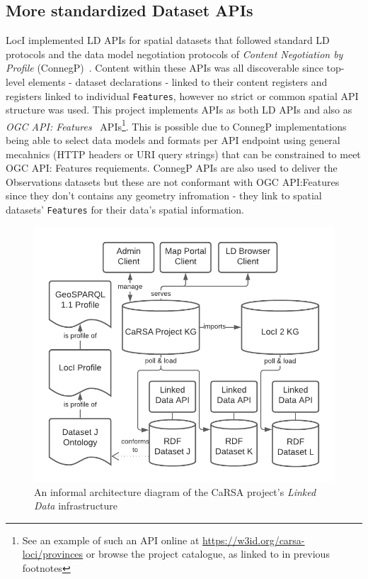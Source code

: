\documentclass[runningheads]{llncs}
\begin{document}
\subsection{More standardized Dataset APIs}
LocI implemented LD APIs for spatial datasets that followed standard LD protocols and the data model negotiation protocols of \textit{Content Negotiation by Profile} (ConnegP)~\cite{atkinson_profiles_2020}.
Content within these APIs was all discoverable since top-level elements - dataset declarations - linked to their content registers and registers linked to individual \texttt{Features}, 
however no strict or common spatial API structure was used. This project implements APIs as both LD APIs and also as \textit{OGC API: Features}~\cite{clemens_portele_ogc_2019} APIs\footnote{See an example of such an API online at \url{https://w3id.org/carsa-loci/provinces} or browse the project catalogue, as linked to in previous footnotes}.
This is possible due to ConnegP implementations being able to select data models and formats per API endpoint using general mecahnics (HTTP headers or URI query strings) that can be constrained
to meet OGC API: Features requiements. ConnegP APIs are also used to deliver the Observations datasets but these are not conformant with OGC API:Features since they don't contains any geometry 
infromation - they link to spatial datasets' \texttt{Features} for their data's spatial information.

\begin{figure}[htb]
    \centering
    \includegraphics[width=0.8\linewidth]{images/carsa-arch.png}
    \caption{An informal architecture diagram of the CaRSA project's \textit{Linked Data} infrastructure}
    \label{fig:carsa-arch}
\end{figure}
\end{document}
